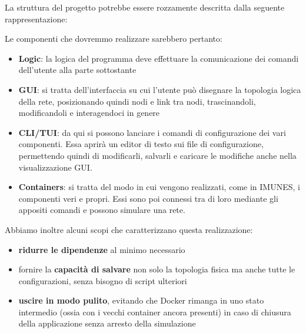 La struttura del progetto potrebbe essere rozzamente descritta dalla seguente rappresentazione:

\begin{center}
\end{center}

Le componenti che dovremmo realizzare sarebbero pertanto:\begin{itemize}
\item \textbf{Logic}: la logica del programma deve effettuare la comunicazione dei comandi dell'utente alla parte sottostante
\item \textbf{GUI}: si tratta dell'interfaccia su cui l'utente può disegnare la topologia logica della rete, posizionando quindi nodi e link tra nodi, trascinandoli, modificandoli e interagendoci in genere
\item \textbf{CLI/TUI}: da qui si possono lanciare i comandi di configurazione dei vari componenti. Essa aprirà un editor di testo sui file di configurazione, permettendo quindi di modificarli, salvarli e caricare le modifiche anche nella visualizzazione GUI.
\item \textbf{Containers}: si tratta del modo in cui vengono realizzati, come in IMUNES, i componenti veri e propri. Essi sono poi connessi tra di loro mediante gli appositi comandi e possono simulare una rete.
\end{itemize}

Abbiamo inoltre alcuni scopi che caratterizzano questa realizzazione:\begin{itemize}
\item \textbf{ridurre le dipendenze} al minimo necessario
\item fornire la \textbf{capacità di salvare} non solo la topologia fisica ma anche tutte le configurazioni, senza bisogno di script ulteriori
\item \textbf{uscire in modo pulito}, evitando che Docker rimanga in uno stato intermedio (ossia con i vecchi container ancora presenti) in caso di chiusura della applicazione senza arresto della simulazione
\end{itemize}



\newpage
